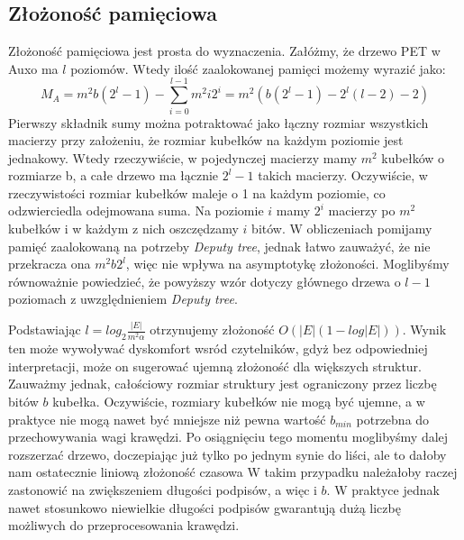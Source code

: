\documentclass{article}
\theoremstyle{definition}
\begin{document}
    \subsection{Złożoność pamięciowa}
    Złożoność pamięciowa jest prosta do wyznaczenia. Załóżmy, że drzewo PET w Auxo ma $l$ poziomów. Wtedy ilość zaalokowanej pamięci możemy wyrazić jako:
    \[
        M_A = m^2 b (2^l - 1) - \sum_{i=0}^{l-1}m^2 i 2^i = m^2(b(2^l - 1) - 2^l(l - 2) - 2)
    \]
    Pierwszy składnik sumy można potraktować jako łączny rozmiar wszystkich macierzy przy założeniu, że rozmiar kubełków na każdym poziomie jest jednakowy. Wtedy rzeczywiście, w pojedynczej macierzy mamy $m^2$ kubełków o rozmiarze b, a całe drzewo ma łącznie $2^l - 1$ takich macierzy. Oczywiście, w rzeczywistości rozmiar kubełków maleje o 1 na każdym poziomie, co odzwierciedla odejmowana suma. Na poziomie $i$ mamy $2^i$ macierzy po $m^2$ kubełków i w każdym z nich oszczędzamy $i$ bitów. W obliczeniach pomijamy pamięć zaalokowaną na potrzeby \textit{Deputy tree}, jednak łatwo zauważyć, że nie przekracza ona $m^2 b 2^l$, więc nie wpływa na asymptotykę złożoności. Moglibyśmy równoważnie powiedzieć, że powyższy wzór dotyczy głównego drzewa o $l - 1$ poziomach z uwzględnieniem \textit{Deputy tree}.

    Podstawiając $l = log_2\frac{|E|}{m^2\alpha}$ otrzynujemy złożoność $O(|E|(1 - log|E|))$. Wynik ten może wywoływać dyskomfort wsród czytelników, gdyż bez odpowiedniej interpretacji, może on sugerować ujemną złożoność dla większych struktur. Zauważmy jednak, całościowy rozmiar struktury jest ograniczony przez liczbę bitów $b$ kubełka. Oczywiście, rozmiary kubełków nie mogą być ujemne, a w praktyce nie mogą nawet być mniejsze niż pewna wartość $b_{min}$ potrzebna do przechowywania wagi krawędzi. Po osiągnięciu tego momentu moglibyśmy dalej rozszerzać drzewo, doczepiając już tylko po jednym synie do liści, ale to dałoby nam ostatecznie liniową złożoność czasowa W takim przypadku należałoby raczej zastonowić na zwiększeniem długości podpisów, a więc i $b$. W praktyce jednak nawet stosunkowo niewielkie długości podpisów gwarantują dużą liczbę możliwych do przeprocesowania krawędzi.
    
\end{document}

